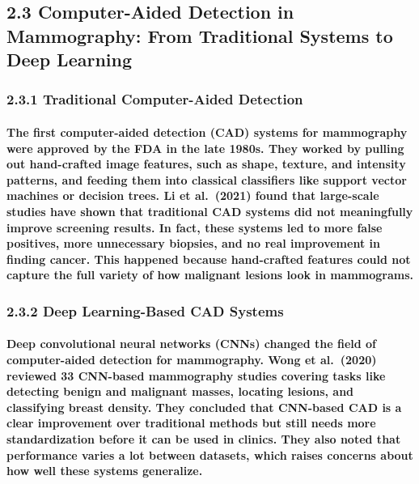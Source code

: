 \subsection{2.3 Computer-Aided Detection in Mammography: From
Traditional Systems to Deep
Learning}\label{computer-aided-detection-in-mammography-from-traditional-systems-to-deep-learning}

\subsubsection{2.3.1 Traditional Computer-Aided
Detection}\label{traditional-computer-aided-detection}

\paragraph{The first computer-aided detection (CAD) systems for mammography were approved by the FDA in the late 1980s. They worked by pulling out hand-crafted image features, such as shape, texture, and intensity patterns, and feeding them into classical classifiers like support vector machines or decision trees. Li et al. (2021) found that large-scale studies have shown that traditional CAD systems did not meaningfully improve screening results. In fact, these systems led to more false positives, more unnecessary biopsies, and no real improvement in finding cancer. This happened because hand-crafted features could not capture the full variety of how malignant lesions look in mammograms.}

\subsubsection{2.3.2 Deep Learning-Based CAD
Systems}\label{deep-learning-based-cad-systems}

\paragraph{Deep convolutional neural networks (CNNs) changed the field of computer-aided detection for mammography. Wong et al. (2020) reviewed 33 CNN-based mammography studies covering tasks like detecting benign and malignant masses, locating lesions, and classifying breast density. They concluded that CNN-based CAD is a clear improvement over traditional methods but still needs more standardization before it can be used in clinics. They also noted that performance varies a lot between datasets, which raises concerns about how well these systems generalize.}

